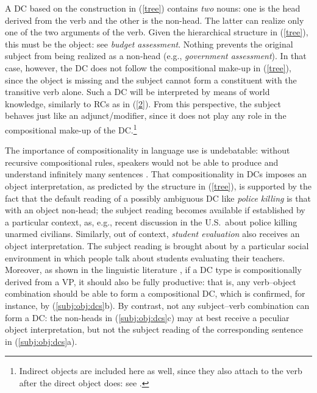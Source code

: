 \documentclass[output=paper]{langsci/langscibook}
\begin{document}
 {A DC based on the construction  in (\ref{tree}) contains \textit{two} nouns: one is the head derived from the verb and the other is the non-head. The latter can realize only one of the two arguments of the verb. Given the hierarchical structure in (\ref{tree}), this must be the object: see \textit{budget assessment}. Nothing prevents the original subject from being realized as a non-head (e.g., \textit{government assessment}). In that case, however, the DC does not follow the compositional make-up in (\ref{tree}), since the object is missing and the subject cannot form a constituent with the transitive verb alone. Such a DC will be interpreted by means of world knowledge, similarly to RCs as in (\ref{2}). From this perspective, the  subject behaves just like an adjunct/modifier, since it does not play any role in the compositional make-up of the DC.}\footnote{Indirect objects are included here as well, since they also attach to the verb after the direct object does: see \cite{larson:88}.}

 The importance of compositionality in language use is undebatable: without recursive compositional rules, speakers would not be able to produce and understand infinitely many sentences \citep{dowty:07}. That compositionality in DCs imposes an object interpretation, as predicted by the structure in (\ref{tree}), is supported by the fact that the default reading of a possibly ambiguous DC like \textit{police killing} is that with an object non-head; the subject reading becomes available if established by a particular context, as, e.g., recent discussion in the U.S.\ about police killing unarmed civilians. Similarly, out of context, \textit{student evaluation} also receives an object interpretation. The subject reading is brought about by a particular social environment in which people talk about students evaluating their teachers. Moreover, as shown in the linguistic literature  \citep{grimshaw:90,borer:13,iordachioaia:alexiadou:pairamidis:17}, if a DC type is  compositionally derived from a VP, it should also be fully productive: that is, any verb--object combination should be able to form a compositional DC, which is confirmed, for instance, by (\ref{subj:obj:dcs}b). By contrast, not any subject--verb combination can form a DC: the non-heads in  (\ref{subj:obj:dcs}c) may at best receive a peculiar object interpretation, but not the subject reading of the corresponding sentence in (\ref{subj:obj:dcs}a).

\begin{exe}
\end{exe}
\end{document}
